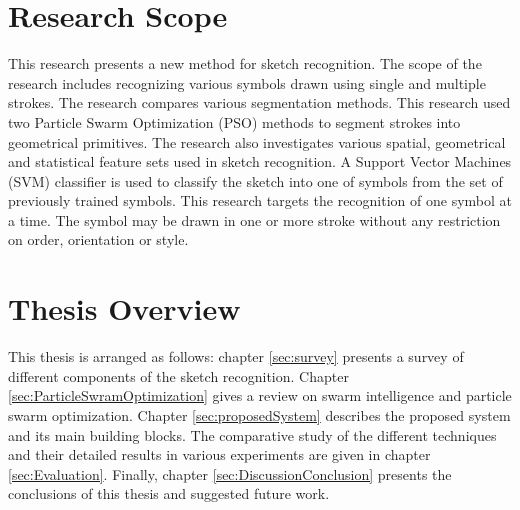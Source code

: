 \section{Research Scope}
This research presents a new method for sketch recognition. The scope of the research includes recognizing various symbols drawn using single and multiple strokes. The research compares various segmentation methods. This research used two Particle Swarm Optimization (PSO) \cite{PSOFirst} methods to segment strokes into geometrical primitives. The research also investigates various spatial, geometrical and statistical feature sets used in sketch recognition. A Support Vector Machines (SVM) classifier \cite{svmintroduce} is used to classify the sketch into one of symbols from the set of previously trained symbols. This research targets the recognition of one symbol at a time. The symbol may be drawn in one or more stroke without any restriction on order, orientation or style.

 
\section{Thesis Overview}
This thesis is arranged as follows: chapter \ref{sec:survey} presents a survey of different components of the sketch recognition. Chapter \ref{sec:ParticleSwramOptimization} gives a review on swarm intelligence and particle swarm optimization.  Chapter \ref{sec:proposedSystem} describes the proposed system and its main building blocks. The comparative study of the different techniques and their detailed results in various experiments are given in chapter \ref{sec:Evaluation}. Finally, chapter \ref{sec:DiscussionConclusion} presents the conclusions of this thesis and suggested future work.

